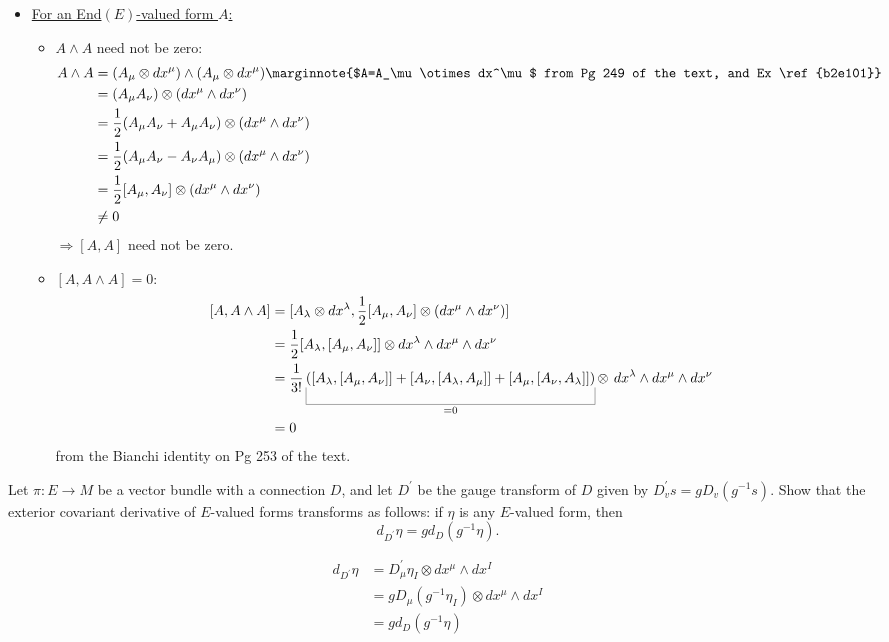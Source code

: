\documentclass[10pt]{article}
\begin{document}
\begin{itemize}
	\item \underline{For an End$(E)$-valued form $A$:}
	\begin{itemize}
		\item $A \wedge A$ need not be zero:
		$$
		\begin{aligned}
			A \wedge A &= (A_\mu \otimes dx^\mu) \wedge (A_\mu \otimes dx^\mu)\marginnote{$A=A_\mu \otimes dx^\mu$ from Pg 249 of the text, and Ex \ref{b2e101}}\\
			&= (A_\mu A_\nu) \otimes (dx^\mu \wedge dx^\nu)\\
			&= \frac12(A_\mu A_\nu + A_\mu A_\nu) \otimes (dx^\mu \wedge dx^\nu)\\
			&= \frac12(A_\mu A_\nu - A_\nu A_\mu) \otimes (dx^\mu \wedge dx^\nu)\\
			&= \frac12[A_\mu, A_\nu] \otimes (dx^\mu \wedge dx^\nu)\\
			&\ne 0
		\end{aligned}
		$$
		$\Rightarrow [A, A]$ need not be zero.
		\item $[A, A \wedge A] = 0$:
		$$
		\begin{aligned}
			[A,A \wedge A] &= [A_\lambda \otimes dx^\lambda, \frac12[A_\mu, A_\nu] \otimes (dx^\mu \wedge dx^\nu)]\\
			&= \frac12 [A_\lambda, [A_\mu, A_\nu]] \otimes dx^\lambda \wedge dx^\mu \wedge dx^\nu\\
			&= \frac{1}{3!}\ub{([A_\lambda, [A_\mu, A_\nu]] + [A_\nu, [A_\lambda, A_\mu]] + [A_\mu, [A_\nu, A_\lambda]])}{=0} \otimes \:\,dx^\lambda \wedge dx^\mu \wedge dx^\nu\\
			&=0
		\end{aligned}
		$$
		from the Bianchi identity on Pg 253 of the text.
	\end{itemize}
	
\end{itemize}


\begin{example}\label{b2e113}
	Let $\pi:E\to M$ be a vector bundle with a connection $D$, and let $D^\prime$ be the gauge transform of $D$ given by $D_v^\prime s = gD_v(g^{-1}s)$. Show that the exterior covariant derivative of $E$-valued forms transforms as follows: if $\eta$ is any $E$-valued form, then
	$$
	d_{D^\prime}\eta = gd_D(g^{-1}\eta).
	$$
\end{example}
\sol 
$$
\begin{aligned}
	d_{D^\prime}\eta &= D_\mu^\prime \eta_I \otimes dx^\mu \wedge dx^I\\
	&= gD_\mu(g^{-1}\eta_I) \otimes dx^\mu \wedge dx^I\\
	&= gd_D(g^{-1}\eta)
\end{aligned}$$
\end{document}
